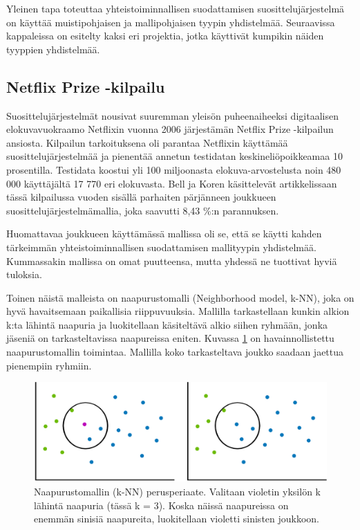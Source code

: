 \documentclass[12pt,finnish]{tktltiki2}
\theoremstyle{definition}
\theoremstyle{remark}
\begin{document}
Yleinen tapa toteuttaa yhteistoiminnallisen suodattamisen suosittelujärjestelmä on käyttää muistipohjaisen ja mallipohjaisen tyypin yhdistelmää. Seuraavissa kappaleissa on esitelty kaksi eri projektia, jotka käyttivät kumpikin näiden tyyppien yhdistelmää.

\subsection{Netflix Prize -kilpailu}

        Suosittelujärjestelmät nousivat suuremman yleisön puheenaiheeksi digitaalisen elokuvavuokraamo Netflixin vuonna 2006 järjestämän Netflix Prize -kilpailun ansiosta. Kilpailun tarkoituksena oli parantaa Netflixin käyttämää suosittelujärjestelmää ja pienentää annetun testidatan keskineliöpoikkeamaa 10 prosentilla. Testidata koostui yli 100 miljoonasta elokuva-arvostelusta noin 480 000 käyttäjältä 17 770 eri elokuvasta. Bell ja Koren käsittelevät artikkelissaan ~\cite{Bell:2007:LNP:1345448.1345465} tässä kilpailussa vuoden sisällä parhaiten pärjänneen joukkueen suosittelujärjestelmämallia, joka saavutti 8,43 \%:n parannuksen.
        
        Huomattavaa joukkueen käyttämässä mallissa oli se, että se käytti kahden tärkeimmän yhteistoiminnallisen suodattamisen mallityypin yhdistelmää. Kummassakin mallissa on omat puutteensa, mutta yhdessä ne tuottivat hyviä tuloksia.
        
        Toinen näistä malleista on naapurustomalli (Neighborhood model, k-NN), joka on hyvä havaitsemaan paikallisia riippuvuuksia. Mallilla tarkastellaan kunkin alkion k:ta lähintä naapuria ja luokitellaan käsiteltävä alkio siihen ryhmään, jonka jäseniä on tarkasteltavissa naapureissa eniten. Kuvassa \ref{knn} on havainnollistettu naapurustomallin toimintaa. Mallilla koko tarkasteltava joukko saadaan jaettua pienempiin ryhmiin.
        
\begin{figure}[]
\includegraphics[width = 370pt]{knnkumpikin.eps}\caption{Naapurustomallin (k-NN) perusperiaate. Valitaan violetin yksilön k lähintä naapuria (tässä k = 3). Koska näissä naapureissa on enemmän sinisiä naapureita, luokitellaan violetti sinisten joukkoon.}
\label{knn}
\end{figure} 
 
\end{document}
